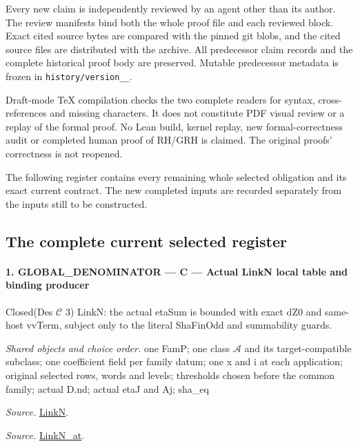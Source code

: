 \documentclass[11pt,a4paper]{article}
\numberwithin{equation}{section}
\theoremstyle{remark}\newtheorem{remark}[theorem]{Remark}
\begin{document}
Every new claim is independently reviewed by an agent other than its
author. The review manifests bind both the whole proof file and each
reviewed block. Exact cited source bytes are compared with the pinned
git blobs, and the cited source files are distributed with the archive.
All predecessor claim records and the complete historical proof body
are preserved. Mutable predecessor metadata is frozen in
\texttt{history/\allowbreak version\_\_}.

Draft-mode TeX compilation checks the two complete readers for syntax,
cross-references and missing characters. It does not constitute PDF
visual review or a replay of the formal proof. No Lean build, kernel
replay, new formal-correctness audit or completed human proof of RH/GRH
is claimed. The original proofs' correctness is not reopened.

The following register contains every remaining whole selected
obligation and its exact current contract. The new completed inputs
are recorded separately from the inputs still to be constructed.

\subsection{The complete current selected register}

\paragraph{1. GLOBAL\_\allowbreak DENOMINATOR — C — Actual LinkN local table and binding producer}

Closed(Des $\mathcal C$ 3) LinkN: the actual etaSum is bounded with exact dZ0 and same-host vvTerm, subject only to the literal ShaFinOdd and summability guards.

\emph{Shared objects and choice order.} one FamP; one class $\mathcal A$ and its target-compatible subclass; one coefficient field per family datum; one x and i at each application; original selected rows, words and levels; thresholds chosen before the common family; actual D.nd; actual etaJ and Aj; sha\_\allowbreak eq

\emph{Source.} \href{https://github.com/CocoSgt/riemann-hypothesis-lean/blob/7cbf7a0c32fca1badf05931879a37c3f8a2b03b4/src/Formalism/SharpRestriction/GlobalTheoremInputs.lean#L45-L48}{LinkN}.

\emph{Source.} \href{https://github.com/CocoSgt/riemann-hypothesis-lean/blob/7cbf7a0c32fca1badf05931879a37c3f8a2b03b4/src/Formalism/SharpRestriction/GlobalTheoremInputs.lean#L40-L44}{LinkN\_\allowbreak at}.
\end{document}
